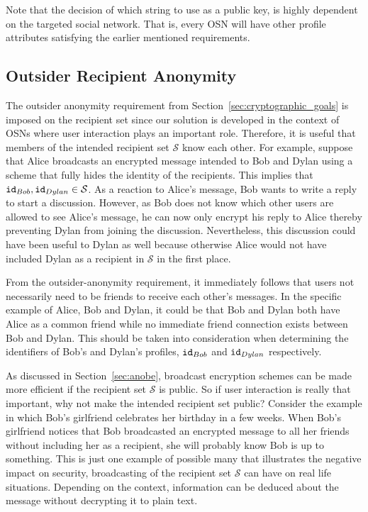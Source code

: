 Note that the decision of which string to use as a public key, is highly dependent on the targeted social network. That is, every OSN will have other profile attributes satisfying the earlier mentioned requirements.


\subsection{Outsider Recipient Anonymity}
The outsider anonymity requirement from Section~\ref{sec:cryptographic_goals} is imposed on the recipient set since our solution is developed in the context of OSNs where user interaction plays an important role. Therefore, it is useful that members of the intended recipient set $\mathcal{S}$ know each other. For example, suppose that Alice broadcasts an encrypted message intended to Bob and Dylan using a scheme that fully hides the identity of the recipients. This implies that $\mathtt{id}_{Bob}, \mathtt{id}_{Dylan} \in \mathcal{S}$. As a reaction to Alice's message, Bob wants to write a reply to start a discussion. However, as Bob does not know which other users are allowed to see Alice's message, he can now only encrypt his reply to Alice thereby preventing Dylan from joining the discussion. Nevertheless, this discussion could have been useful to Dylan as well because otherwise Alice would not have included Dylan as a recipient in $\mathcal{S}$ in the first place.

From the outsider-anonymity requirement, it immediately follows that users not necessarily need to be friends to receive each other's messages. In the specific example of Alice, Bob and Dylan, it could be that Bob and Dylan both have Alice as a common friend while no immediate friend connection exists between Bob and Dylan. This should be taken into consideration when determining the identifiers of Bob's and Dylan's profiles, $\mathtt{id}_{Bob}$ and $\mathtt{id}_{Dylan}$ respectively.

As discussed in Section~\ref{sec:anobe}, broadcast encryption schemes can be made more efficient if the recipient set $\mathcal{S}$ is public. So if user interaction is really that important, why not make the intended recipient set public? Consider the example in which Bob's girlfriend celebrates her birthday in a few weeks. When Bob's girlfriend notices that Bob broadcasted an encrypted message to all her friends without including her as a recipient, she will probably know Bob is up to something. This is just one example of possible many that illustrates the negative impact on security, broadcasting of the recipient set $\mathcal{S}$ can have on real life situations. Depending on the context, information can be deduced about the message without decrypting it to plain text.

